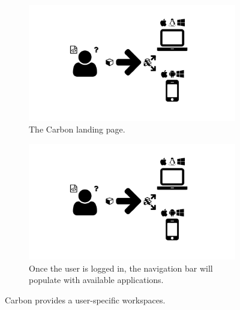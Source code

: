 \begin{figure}
  \centering
  \begin{subfigure}[b]{\textwidth}
    \includegraphics[width=\textwidth, page=9, trim=0.37cm 3.65cm 13.1cm 3.3cm, clip=true]{images/Figures.pdf}
    \caption{The Carbon landing page.}
    \label{Figure:carbon-login-landing}
  \end{subfigure}
  \begin{subfigure}[b]{\textwidth}
    \includegraphics[width=\textwidth, page=9, trim=13.1cm 3.65cm 0.37cm 3.3cm, clip=true]{images/Figures.pdf}
    \caption{Once the user is logged in, the navigation bar will populate with available applications.}
    \label{Figure:carbon-login-logged-in}
  \end{subfigure}
  \caption{Carbon provides a user-specific workspaces.}
  \label{Figure:carbon-login}
\end{figure}

